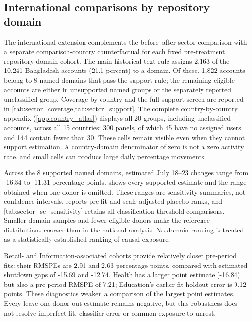 \subsection{International comparisons by repository domain}
\label{sec:sector_sc_results}

The international extension complements the before--after sector comparison with a separate comparison-country counterfactual for each fixed pre-treatment repository-domain cohort. The main historical-text rule assigns 2,163 of the 10,241 Bangladesh accounts (21.1 percent) to a domain. Of these, 1,822 accounts belong to 8 named domains that pass the support rule; the remaining eligible accounts are either in unsupported named groups or the separately reported unclassified group. Coverage by country and the full support screen are reported in \cref{tab:sector_coverage,tab:sector_support}. The complete country-by-country appendix (\cref{app:country_atlas}) displays all 20 groups, including unclassified accounts, across all 15 countries: 300 panels, of which 45 have no assigned users and 144 contain fewer than 30. These cells remain visible even when they cannot support estimation. A country-domain denominator of zero is not a zero activity rate, and small cells can produce large daily percentage movements.



Across the 8 supported named domains, estimated July 18--23 changes range from -16.84 to -11.31 percentage points.  shows every supported estimate and the range obtained when one donor is omitted. These ranges are sensitivity summaries, not confidence intervals.  reports pre-fit and scale-adjusted placebo ranks, and \cref{tab:sector_sc_sensitivity} retains all classification-threshold comparisons. Smaller domain samples and fewer eligible donors make the reference distributions coarser than in the national analysis. No domain ranking is treated as a statistically established ranking of causal exposure.

Retail- and Information-associated cohorts provide relatively closer pre-period fits: their RMSPEs are 2.91 and 2.63 percentage points, compared with estimated shutdown gaps of -15.69 and -12.74. Health has a larger point estimate (-16.84) but also a pre-period RMSPE of 7.21; Education's earlier-fit holdout error is 9.12 points. These diagnostics weaken a comparison of the largest point estimates. Every leave-one-donor-out estimate remains negative, but this robustness does not resolve imperfect fit, classifier error or common exposure to unrest.

